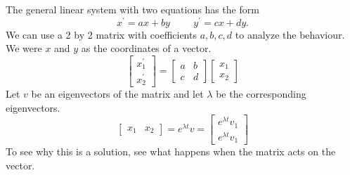 \documentclass[fleqn,letterpaper]{report}
\begin{document}
The general linear system with two equations has the form
\begin{equation*}
x^\prime = ax + by \hspace{1cm} y^\prime = cx + dy.
\end{equation*}
We can use a 2 by 2 matrix with coefficients $a,b,c,d$ to
analyze the behaviour. We were $x$ and $y$ as the coordinates
of a vector.
\begin{equation*}
\left[ \begin{matrix} x_1^\prime \\ x_2^\prime \end{matrix}
\right] = \left[ \begin{matrix} a & b \\ c & d \end{matrix}
\right] \left[ \begin{matrix} x_1 \\ x_2 \end{matrix} \right] 
\end{equation*}
Let $v$ be an eigenvectors of the matrix and let $\lambda$ be the 
corresponding eigenvectors. 
\begin{equation*}
\left[ \begin{matrix} x_1 & x_2 \end{matrix} \right] =
e^{\lambda t} v = 
\left[ \begin{matrix} e^{\lambda t} v_1 \\ e^{\lambda t} v_1
\end{matrix} \right]
\end{equation*}
To see why this is a solution, see what happens when the
matrix acts on the vector. 
\end{document}
